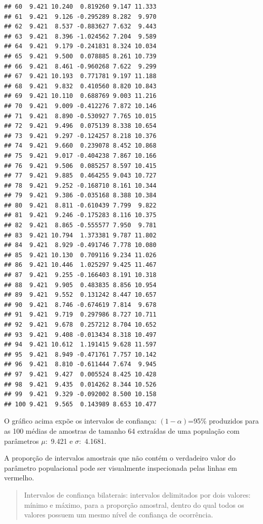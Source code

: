 \documentclass[
]{book}
\begin{document}
\begin{verbatim}
## 60  9.421 10.240  0.819260 9.147 11.333
## 61  9.421  9.126 -0.295289 8.282  9.970
## 62  9.421  8.537 -0.883627 7.632  9.443
## 63  9.421  8.396 -1.024562 7.204  9.589
## 64  9.421  9.179 -0.241831 8.324 10.034
## 65  9.421  9.500  0.078885 8.261 10.739
## 66  9.421  8.461 -0.960268 7.622  9.299
## 67  9.421 10.193  0.771781 9.197 11.188
## 68  9.421  9.832  0.410560 8.820 10.843
## 69  9.421 10.110  0.688769 9.003 11.216
## 70  9.421  9.009 -0.412276 7.872 10.146
## 71  9.421  8.890 -0.530927 7.765 10.015
## 72  9.421  9.496  0.075139 8.338 10.654
## 73  9.421  9.297 -0.124257 8.218 10.376
## 74  9.421  9.660  0.239078 8.452 10.868
## 75  9.421  9.017 -0.404238 7.867 10.166
## 76  9.421  9.506  0.085257 8.597 10.415
## 77  9.421  9.885  0.464255 9.043 10.727
## 78  9.421  9.252 -0.168710 8.161 10.344
## 79  9.421  9.386 -0.035168 8.388 10.384
## 80  9.421  8.811 -0.610439 7.799  9.822
## 81  9.421  9.246 -0.175283 8.116 10.375
## 82  9.421  8.865 -0.555577 7.950  9.781
## 83  9.421 10.794  1.373381 9.787 11.802
## 84  9.421  8.929 -0.491746 7.778 10.080
## 85  9.421 10.130  0.709116 9.234 11.026
## 86  9.421 10.446  1.025297 9.425 11.467
## 87  9.421  9.255 -0.166403 8.191 10.318
## 88  9.421  9.905  0.483835 8.856 10.954
## 89  9.421  9.552  0.131242 8.447 10.657
## 90  9.421  8.746 -0.674619 7.814  9.678
## 91  9.421  9.719  0.297986 8.727 10.711
## 92  9.421  9.678  0.257212 8.704 10.652
## 93  9.421  9.408 -0.013434 8.318 10.497
## 94  9.421 10.612  1.191415 9.628 11.597
## 95  9.421  8.949 -0.471761 7.757 10.142
## 96  9.421  8.810 -0.611444 7.674  9.945
## 97  9.421  9.427  0.005524 8.425 10.428
## 98  9.421  9.435  0.014262 8.344 10.526
## 99  9.421  9.329 -0.092002 8.500 10.158
## 100 9.421  9.565  0.143989 8.653 10.477
\end{verbatim}

\hfill\break

O gráfico acima expõe os intervalos de confiança: \((1-\alpha)\)=95\% produzidos para as 100 médias de amostras de tamanho 64 extraídas de uma população com parâmetros \(\mu:\) 9.421 e \(\sigma:\) 4.1681.

\hfill\break

A proporção de intervalos amostrais que não contém o verdadeiro valor do parâmetro populacional pode ser visualmente inspecionada pelas linhas em vermelho.

\hfill\break

\begin{quote}
Intervalos de confiança bilaterais: intervalos delimitados por dois valores: mínimo e máximo, para a proporção amostral, dentro do qual todos os valores possuem um mesmo nível de confiança de ocorrência.
\end{quote}
\end{document}
